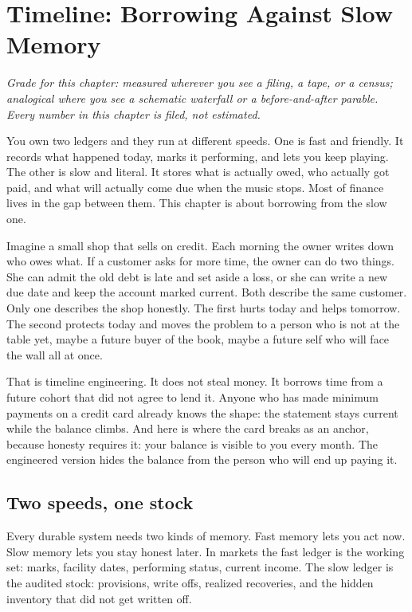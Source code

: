 \chapter{Timeline: Borrowing Against Slow Memory}
\label{ch:timeline}

\textit{Grade for this chapter: measured wherever you see a filing, a tape, or a census; analogical where you see a schematic waterfall or a before-and-after parable. Every number in this chapter is filed, not estimated.}

You own two ledgers and they run at different speeds. One is fast and friendly. It records what happened today, marks it performing, and lets you keep playing. The other is slow and literal. It stores what is actually owed, who actually got paid, and what will actually come due when the music stops. Most of finance lives in the gap between them. This chapter is about borrowing from the slow one.

Imagine a small shop that sells on credit. Each morning the owner writes down who owes what. If a customer asks for more time, the owner can do two things. She can admit the old debt is late and set aside a loss, or she can write a new due date and keep the account marked current. Both describe the same customer. Only one describes the shop honestly. The first hurts today and helps tomorrow. The second protects today and moves the problem to a person who is not at the table yet, maybe a future buyer of the book, maybe a future self who will face the wall all at once.

That is timeline engineering. It does not steal money. It borrows time from a future cohort that did not agree to lend it. Anyone who has made minimum payments on a credit card already knows the shape: the statement stays current while the balance climbs. And here is where the card breaks as an anchor, because honesty requires it: your balance is visible to you every month. The engineered version hides the balance from the person who will end up paying it.

\section{Two speeds, one stock}

Every durable system needs two kinds of memory. Fast memory lets you act now. Slow memory lets you stay honest later. In markets the fast ledger is the working set: marks, facility dates, performing status, current income. The slow ledger is the audited stock: provisions, write offs, realized recoveries, and the hidden inventory that did not get written off.

